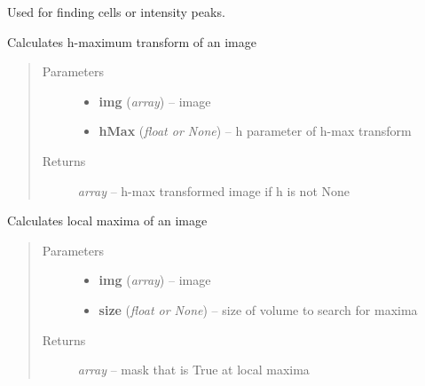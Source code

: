 \documentclass[letterpaper,10pt,english]{sphinxmanual}
\begin{document}
Used for finding cells or intensity peaks.

\begin{fulllineitems}
\label{api/ClearMap.ImageProcessing:ClearMap.ImageProcessing.MaximaDetection.hMaxTransform}
Calculates h-maximum transform of an image
\begin{quote}\begin{description}
\item[{Parameters}] \leavevmode\begin{itemize}
\item {} 
\textbf{img} (\emph{array}) --
image

\item {} 
\textbf{hMax} (\emph{float or None}) --
h parameter of h-max transform

\end{itemize}

\item[{Returns}] \leavevmode
\emph{array} --
h-max transformed image if h is not None

\end{description}\end{quote}

\end{fulllineitems}


\begin{fulllineitems}
\label{api/ClearMap.ImageProcessing:ClearMap.ImageProcessing.MaximaDetection.localMax}
Calculates local maxima of an image
\begin{quote}\begin{description}
\item[{Parameters}] \leavevmode\begin{itemize}
\item {} 
\textbf{img} (\emph{array}) --
image

\item {} 
\textbf{size} (\emph{float or None}) --
size of volume to search for maxima

\end{itemize}

\item[{Returns}] \leavevmode
\emph{array} --
mask that is True at local maxima

\end{description}\end{quote}

\end{fulllineitems}
\end{document}
